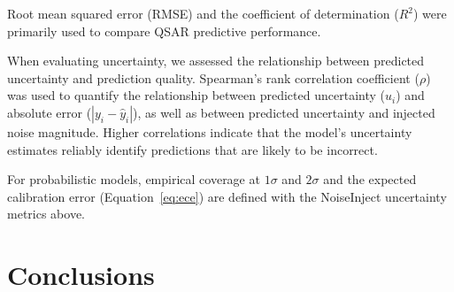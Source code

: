 Root mean squared error (RMSE) and the coefficient of determination ($R^2$) were primarily used to compare QSAR predictive performance.


When evaluating uncertainty, we assessed the relationship between predicted uncertainty and prediction quality. Spearman's rank correlation coefficient ($\rho$) was used to quantify the relationship between predicted uncertainty ($u_i$) and absolute error ($|y_i - \hat{y}_i|$), as well as between predicted uncertainty and injected noise magnitude. Higher correlations indicate that the model's uncertainty estimates reliably identify predictions that are likely to be incorrect.

For probabilistic models, empirical coverage at $1\sigma$ and $2\sigma$ and the expected calibration error (Equation~\ref{eq:ece}) are defined with the NoiseInject uncertainty metrics above.

\section{Conclusions}

